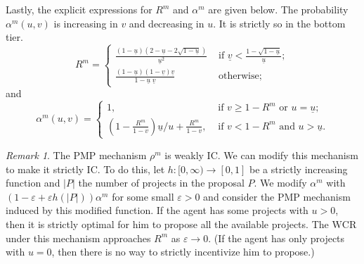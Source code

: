 \documentclass[12pt,english]{article}
\newcommand{\underv}{\underline{v}}
\newcommand{\under}{\underline}
\newcommand{\underu}{{\underline{u}}}
\newcommand{\eran}[1]{\begin{framed}{\noindent {\bf Eran:} #1}\end{framed}}
\theoremstyle{remark}
\newtheorem{remark}{Remark}
\theoremstyle{plain}
\theoremstyle{definition}
\newcommand{\wcr}{\mathrm{WCR}}
\begin{document}
Lastly, the explicit expressions for $R^m$ and $\alpha^m$ are given below. The probability $\alpha^m(u,v)$ is increasing in $v$ and decreasing in $u$. It is strictly so in the bottom tier.
\[
R^m=\begin{cases}
 \frac{(1-\underu) \left(2-\underu-2 \sqrt{1-\underu}\right)}{\underu^2} & \text{ if }\underv<\frac{1-\sqrt{1-\underu}}{\underu}; \\
 \frac{(1-\underu) (1-\underv) \underv}{1-\underu \; \underv} & \text{ otherwise};
\end{cases}\]
and
\[
\alpha^m(u,v)= \begin{cases}1, &\text{ if }v\geqslant 1-R^m \text{ or } u=\under u;\\ \left(1-\frac{R^m}{1-v} \right) { \under u}/{u}+\frac{R^m}{1-v}, &\text{ if }v<1-R^m \text{ and } u>\under u. \end{cases}\]   

\begin{remark}
The PMP mechanism $\rho^m$ is weakly IC. We can modify this mechanism to make it strictly IC. To do this, let $h:[0, \infty) \rightarrow [0,1]$ be a strictly increasing function and $|P|$ the number of projects in the proposal $P$. We modify $\alpha^m$ with $(1-\varepsilon + \varepsilon h(|P|))\alpha^m$ for some small $\varepsilon>0$ and consider the PMP mechanism induced by this modified function. If the agent has some projects with $u>0$, then it is strictly optimal for him to propose all the available projects. The $\wcr$ under this mechanism approaches $R^m$ as $\varepsilon\rightarrow 0$. (If the agent has only projects with $u=0$, then there is no way to strictly incentivize him to propose.)
\end{remark}
\end{document}
